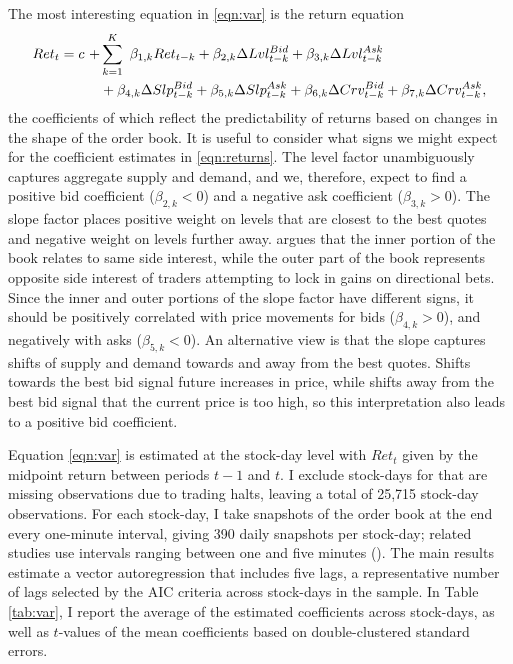 	The most interesting equation in \eqref{eqn:var} is the return equation
	\begin{align}
		\label{eqn:returns}
		Ret_t = c \ + & \sum_{k=1}^{K} \ \beta_{1,k} Ret_{t-k} + \beta_{2, k} \Delta Lvl_{t-k}^{Bid} + \beta_{3, k} \Delta Lvl_{t-k}^{Ask} \notag \\
		& + \beta_{4, k} \Delta Slp_{t-k}^{Bid} + \beta_{5, k} \Delta Slp_{t-k}^{Ask} + \beta_{6, k}\Delta Crv_{t-k}^{Bid} + \beta_{7, k} \Delta Crv_{t-k}^{Ask},
	\end{align}
	the coefficients of which reflect the predictability of returns based on changes in the shape of the order book. It is useful to consider what signs we might expect for the coefficient estimates in \eqref{eqn:returns}. The level factor unambiguously captures aggregate supply and demand, and we, therefore, expect to find a positive bid coefficient ($\beta_{2, k} < 0$) and a negative ask coefficient ($\beta_{3, k} > 0$). The slope factor places positive weight on levels that are closest to the best quotes and negative weight on levels further away. \citet{Yuferova2015} argues that the inner portion of the book relates to same side interest, while the outer part of the book represents opposite side interest of traders attempting to lock in gains on directional bets. Since the inner and outer portions of the slope factor have different signs, it should be positively correlated with price movements for bids ($\beta_{4,k} > 0$), and negatively with asks ($\beta_{5,k} < 0$). An alternative view is that the slope captures shifts of supply and demand towards and away from the best quotes. Shifts towards the best bid signal future increases in price, while shifts away from the best bid signal that the current price is too high, so this interpretation also leads to a positive bid coefficient.

	Equation \eqref{eqn:var} is estimated at the stock-day level with $Ret_t$ given by the midpoint return between periods $t-1$ and $t$. I exclude stock-days for that are missing observations due to trading halts, leaving a total of 25,715 stock-day observations. For each stock-day, I take snapshots of the order book at the end every one-minute interval, giving 390 daily snapshots per stock-day; related studies use intervals ranging between one and five minutes (\citet{Yuferova2015,Cao2009}). The main results estimate a vector autoregression that includes five lags, a representative number of lags selected by the AIC criteria across stock-days in the sample. In Table \ref{tab:var}, I report the average of the estimated coefficients across stock-days, as well as $t$-values of the mean coefficients based on double-clustered standard errors.


